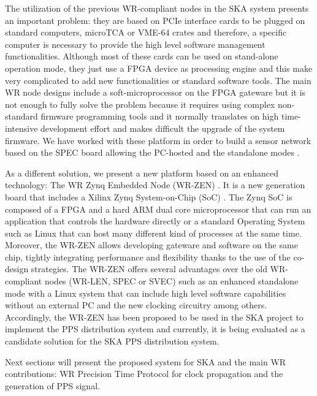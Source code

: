 The utilization of the previous WR-compliant nodes in the SKA system presents an important problem: they are based on PCIe interface cards to be plugged on standard computers, microTCA or VME-64 crates and therefore, a specific computer is necessary to provide the high 
level software management functionalities. Although most of these cards can be used on stand-alone operation mode, they just use a FPGA device as processing engine and this make very complicated to add new functionalities or standard software tools. The main WR node designs include a soft-microprocessor on the FPGA gateware but it is not 
enough to fully solve the problem because it requires using complex 
non-standard firmware programming tools and it normally translates on high time-intensive development effort and makes difficult the upgrade of the system firmware. We have worked with these platform in order to build a sensor network based on the SPEC board allowing the PC-hosted and the standalone modes \cite{migueljl-paper-wr-spec}.

As a different solution, we present a new platform based on an enhanced technology: The WR Zynq Embedded Node (WR-ZEN) \cite{sevensols:wr_zen}. It is a new generation board that includes a Xilinx Zynq System-on-Chip (SoC) \cite{xilinx:zynq}. The Zynq SoC is composed of a FPGA and a hard ARM dual core microprocessor that can run an application that controls the hardware directly or a standard Operating System such as Linux that can host many different kind of processes at the same time. Moreover, the WR-ZEN allows developing gateware and software on the same chip, tightly integrating performance and flexibility thanks to the use of the co-design strategies. The WR-ZEN offers several advantages over the old WR-compliant nodes (WR-LEN, SPEC or SVEC) such as an enhanced standalone mode with a Linux system that can include high level software capabilities without an external PC and the new clocking circuitry among others. Accordingly, the WR-ZEN has been proposed to be used in the SKA project to implement the PPS distribution system and currently, it is being evaluated as a candidate solution for the SKA PPS distribution system.  

Next sections will present the proposed system for SKA and the main WR contributions: WR Precision Time Protocol for clock propagation and the generation of PPS signal. 
